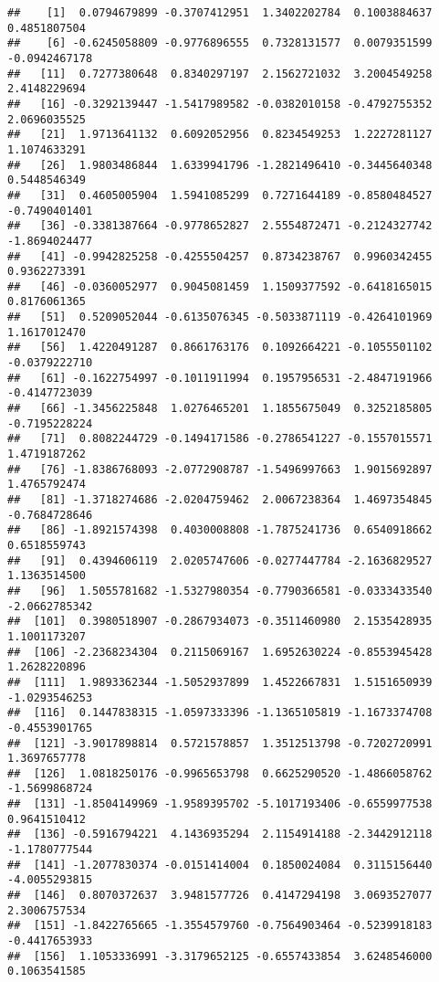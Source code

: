 \documentclass[
]{article}
\begin{document}
\begin{verbatim}
##    [1]  0.0794679899 -0.3707412951  1.3402202784  0.1003884637  0.4851807504
##    [6] -0.6245058809 -0.9776896555  0.7328131577  0.0079351599 -0.0942467178
##   [11]  0.7277380648  0.8340297197  2.1562721032  3.2004549258  2.4148229694
##   [16] -0.3292139447 -1.5417989582 -0.0382010158 -0.4792755352  2.0696035525
##   [21]  1.9713641132  0.6092052956  0.8234549253  1.2227281127  1.1074633291
##   [26]  1.9803486844  1.6339941796 -1.2821496410 -0.3445640348  0.5448546349
##   [31]  0.4605005904  1.5941085299  0.7271644189 -0.8580484527 -0.7490401401
##   [36] -0.3381387664 -0.9778652827  2.5554872471 -0.2124327742 -1.8694024477
##   [41] -0.9942825258 -0.4255504257  0.8734238767  0.9960342455  0.9362273391
##   [46] -0.0360052977  0.9045081459  1.1509377592 -0.6418165015  0.8176061365
##   [51]  0.5209052044 -0.6135076345 -0.5033871119 -0.4264101969  1.1617012470
##   [56]  1.4220491287  0.8661763176  0.1092664221 -0.1055501102 -0.0379222710
##   [61] -0.1622754997 -0.1011911994  0.1957956531 -2.4847191966 -0.4147723039
##   [66] -1.3456225848  1.0276465201  1.1855675049  0.3252185805 -0.7195228224
##   [71]  0.8082244729 -0.1494171586 -0.2786541227 -0.1557015571  1.4719187262
##   [76] -1.8386768093 -2.0772908787 -1.5496997663  1.9015692897  1.4765792474
##   [81] -1.3718274686 -2.0204759462  2.0067238364  1.4697354845 -0.7684728646
##   [86] -1.8921574398  0.4030008808 -1.7875241736  0.6540918662  0.6518559743
##   [91]  0.4394606119  2.0205747606 -0.0277447784 -2.1636829527  1.1363514500
##   [96]  1.5055781682 -1.5327980354 -0.7790366581 -0.0333433540 -2.0662785342
##  [101]  0.3980518907 -0.2867934073 -0.3511460980  2.1535428935  1.1001173207
##  [106] -2.2368234304  0.2115069167  1.6952630224 -0.8553945428  1.2628220896
##  [111]  1.9893362344 -1.5052937899  1.4522667831  1.5151650939 -1.0293546253
##  [116]  0.1447838315 -1.0597333396 -1.1365105819 -1.1673374708 -0.4553901765
##  [121] -3.9017898814  0.5721578857  1.3512513798 -0.7202720991  1.3697657778
##  [126]  1.0818250176 -0.9965653798  0.6625290520 -1.4866058762 -1.5699868724
##  [131] -1.8504149969 -1.9589395702 -5.1017193406 -0.6559977538  0.9641510412
##  [136] -0.5916794221  4.1436935294  2.1154914188 -2.3442912118 -1.1780777544
##  [141] -1.2077830374 -0.0151414004  0.1850024084  0.3115156440 -4.0055293815
##  [146]  0.8070372637  3.9481577726  0.4147294198  3.0693527077  2.3006757534
##  [151] -1.8422765665 -1.3554579760 -0.7564903464 -0.5239918183 -0.4417653933
##  [156]  1.1053336991 -3.3179652125 -0.6557433854  3.6248546000  0.1063541585

\end{verbatim}
\end{document}
